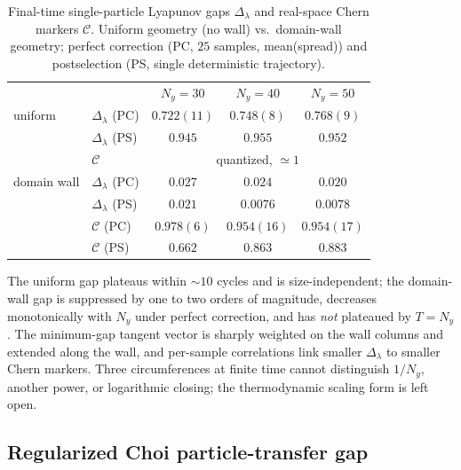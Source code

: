 \documentclass[aps,prl,onecolumn,superscriptaddress,nofootinbib]{revtex4-2}
\newcommand{\calC}{\mathcal{C}}
\newcommand{\Dlam}{\Delta_{\lambda}}
\begin{document}
\begin{table}[h]
\caption{\label{tab:lyap}Final-time single-particle Lyapunov gaps $\Dlam$ and real-space Chern markers $\calC$.  Uniform geometry (no wall) vs.\ domain-wall geometry; perfect correction (PC, $25$ samples, mean(spread)) and postselection (PS, single deterministic trajectory).}
\begin{ruledtabular}
\begin{tabular}{llccc}
 & & $N_y=30$ & $N_y=40$ & $N_y=50$ \\
\colrule
uniform & $\Dlam$ (PC) & $0.722(11)$ & $0.748(8)$ & $0.768(9)$ \\
        & $\Dlam$ (PS) & $0.945$ & $0.955$ & $0.952$ \\
        & $\calC$       & \multicolumn{3}{c}{quantized, $\simeq1$} \\
\colrule
domain wall & $\Dlam$ (PC) & $0.027$ & $0.024$ & $0.020$ \\
            & $\Dlam$ (PS) & $0.021$ & $0.0076$ & $0.0078$ \\
            & $\calC$ (PC)  & $0.978(6)$ & $0.954(16)$ & $0.954(17)$ \\
            & $\calC$ (PS)  & $0.662$ & $0.863$ & $0.883$ \\
\end{tabular}
\end{ruledtabular}
\end{table}

The uniform gap plateaus within ${\sim}10$ cycles and is size-independent; the domain-wall gap is suppressed by one to two orders of magnitude, decreases monotonically with $N_y$ under perfect correction, and has \emph{not} plateaued by $T=N_y$.  The minimum-gap tangent vector is sharply weighted on the wall columns and extended along the wall, and per-sample correlations link smaller $\Dlam$ to smaller Chern markers.  Three circumferences at finite time cannot distinguish $1/N_y$, another power, or logarithmic closing; the thermodynamic scaling form is left open.

\subsection{Regularized Choi particle-transfer gap}
\end{document}
